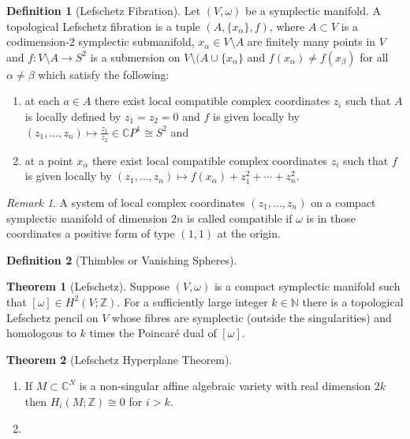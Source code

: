 \documentclass[a4paper]{article}
\newcommand{\CC}{\mathbb{C}}
\newcommand{\ZZ}{\mathbb{Z}}
\newcommand{\NN}{\mathbb{N}}
\newcommand{\lra}{\longrightarrow}
\theoremstyle{definition}
\newtheorem{thm}{Theorem}
\theoremstyle{definition}
\newtheorem{definition}{Definition}
\theoremstyle{remark}
\newtheorem{rmk}{Remark}
\theoremstyle{remark}
\theoremstyle{remark}
\begin{document}
\begin{definition}[Lefschetz Fibration]
  Let $(V,\omega)$ be a symplectic manifold. A topological Lefschetz fibration is a tuple $(A,\{x_{\alpha}\},f)$, where $A\subset V$ is a codimension-2 symplectic submanifold, $x_{\alpha}\in V\setminus A$ are finitely many points in $V$ and $f:V\setminus A\lra S^2$ is a submersion on $V\setminus(A\cup\{x_{\alpha}\}$ and $f(x_{\alpha})\neq f(x_{\beta})$ for all $\alpha\neq\beta$ which satisfy the following:
  \begin{enumerate}
    \item at each $a\in A$ there exist local compatible complex coordinates $z_i$ such that $A$ is locally defined by $z_1=z_2=0$ and $f$ is given locally by $(z_1,\ldots,z_n)\longmapsto\frac{z_1}{z_2}\in\CC P^1\cong S^2$ and
    \item at a point $x_{\alpha}$ there exist local compatible complex coordinates $z_i$ such that $f$ is given locally by $(z_1,\ldots,z_n)\longmapsto f(x_{\alpha})+z_1^2+\cdots+z_n^2$.
  \end{enumerate}
\end{definition}

\begin{rmk}
  A system of local complex coordinates $(z_1,\ldots,z_n)$ on a compact symplectic manifold of dimension $2n$ is called compatible if $\omega$ is in those coordinates a positive form of type $(1,1)$ at the origin.
\end{rmk}

\begin{definition}[Thimbles or Vanishing Spheres]
  
\end{definition}

\begin{thm}[Lefschetz]
  Suppose $(V,\omega)$ is a compact symplectic manifold such that $[\omega]\in H^2(V;\ZZ)$. For a sufficiently large integer $k\in\NN$ there is a topological Lefschetz pencil on $V$ whose fibres are symplectic (outside the singularities) and homologous to $k$ times the Poincar\'e dual of $[\omega]$.
\end{thm}

\begin{thm}[Lefschetz Hyperplane Theorem]
  \begin{enumerate}
    \item If $M\subset\CC^N$ is a non-singular affine algebraic variety with real dimension $2k$ then $H_i(M;\ZZ)\cong 0$ for $i>k$.
    \item
  \end{enumerate}
\end{thm}
\end{document}
